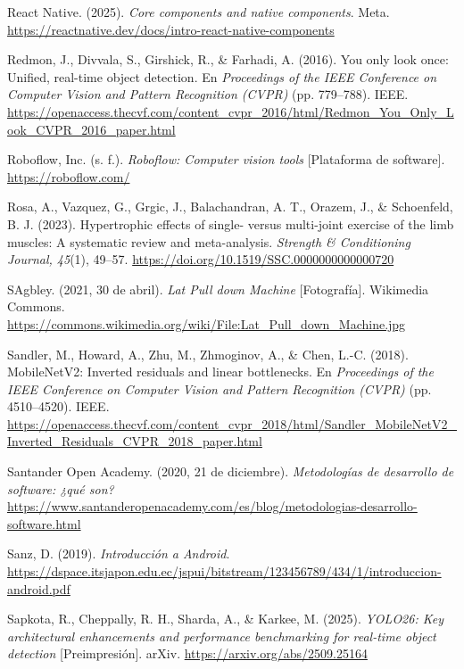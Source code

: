 \begin{referenciasapa}
\item React Native. (2025). \textit{Core components and native components}. Meta. \url{https://reactnative.dev/docs/intro-react-native-components}

\item Redmon, J., Divvala, S., Girshick, R., \& Farhadi, A. (2016). You only look once: Unified, real-time object detection. En \textit{Proceedings of the IEEE Conference on Computer Vision and Pattern Recognition (CVPR)} (pp. 779--788). IEEE. \url{https://openaccess.thecvf.com/content_cvpr_2016/html/Redmon_You_Only_Look_CVPR_2016_paper.html}

\item Roboflow, Inc. (s. f.). \textit{Roboflow: Computer vision tools} [Plataforma de software]. \url{https://roboflow.com/}

\item Rosa, A., Vazquez, G., Grgic, J., Balachandran, A. T., Orazem, J., \& Schoenfeld, B. J. (2023). Hypertrophic effects of single- versus multi-joint exercise of the limb muscles: A systematic review and meta-analysis. \textit{Strength \& Conditioning Journal, 45}(1), 49--57. \url{https://doi.org/10.1519/SSC.0000000000000720}

\item SAgbley. (2021, 30 de abril). \textit{Lat Pull down Machine} [Fotografía]. Wikimedia Commons. \url{https://commons.wikimedia.org/wiki/File:Lat_Pull_down_Machine.jpg}

\item Sandler, M., Howard, A., Zhu, M., Zhmoginov, A., \& Chen, L.-C. (2018). MobileNetV2: Inverted residuals and linear bottlenecks. En \textit{Proceedings of the IEEE Conference on Computer Vision and Pattern Recognition (CVPR)} (pp. 4510--4520). IEEE. \url{https://openaccess.thecvf.com/content_cvpr_2018/html/Sandler_MobileNetV2_Inverted_Residuals_CVPR_2018_paper.html}

\item Santander Open Academy. (2020, 21 de diciembre). \textit{Metodologías de desarrollo de software: ¿qué son?} \url{https://www.santanderopenacademy.com/es/blog/metodologias-desarrollo-software.html}

\item Sanz, D. (2019). \textit{Introducción a Android}. \url{https://dspace.itsjapon.edu.ec/jspui/bitstream/123456789/434/1/introduccion-android.pdf}

\item Sapkota, R., Cheppally, R. H., Sharda, A., \& Karkee, M. (2025). \textit{YOLO26: Key architectural enhancements and performance benchmarking for real-time object detection} [Preimpresión]. arXiv. \url{https://arxiv.org/abs/2509.25164}


\end{referenciasapa}
